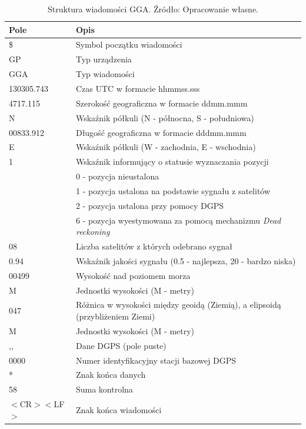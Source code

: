 \begin{table}[H]
\centering
\caption{Struktura wiadomości GGA. Źródło: Opracowanie własne.}
\label{table:table_nmea_gga_message}
\begin{tabular}{| l | l |}
\hline
\textbf{Pole} & \textbf{Opis} \\ \hline
\$ & Symbol początku wiadomości  \\ \hline
GP & Typ urządzenia  \\ \hline
GGA & Typ wiadomości  \\ \hline
130305.743 & Czas UTC w formacie hhmmss.sss \\ \hline
4717.115 & Szerokość geograficzna w formacie ddmm.mmm \\ \hline
N & Wskaźnik półkuli (N - północna, S - południowa) \\ \hline
00833.912 & Długość geograficzna w formacie dddmm.mmm  \\ \hline
E & Wskaźnik półkuli (W - zachodnia, E - wschodnia) \\ \hline
1 & Wskaźnik informujący o statusie wyznaczania pozycji \\ 
 & 0 - pozycja nieustalona \\ 
 & 1 - pozycja ustalona na podstawie sygnału z satelitów \\ 
 & 2 - pozycja ustalona przy pomocy DGPS \\ 
 & 6 - pozycja wyestymowana za pomocą mechanizmu \textit{Dead reckoning} \\ \hline
08 & Liczba satelitów z których odebrano sygnał \\ \hline
0.94 & Wskaźnik jakości sygnału (0.5 - najlepsza, 20 - bardzo niska) \\ \hline
00499 & Wysokość nad poziomem morza \\ \hline
M & Jednostki wysokości (M - metry) \\ \hline
047 & Różnica w wysokości między geoidą (Ziemią), a elipsoidą (przybliżeniem Ziemi) \\ \hline
M & Jednostki wysokości (M - metry) \\ \hline
,, & Dane DGPS (pole puste) \\ \hline
0000 & Numer identyfikacyjny stacji bazowej DGPS \\ \hline
* & Znak końca danych \\ \hline
58 & Suma kontrolna \\ \hline
$<$CR$><$LF$>$ & Znak końca wiadomości \\ \hline
\end{tabular}
\end{table}

